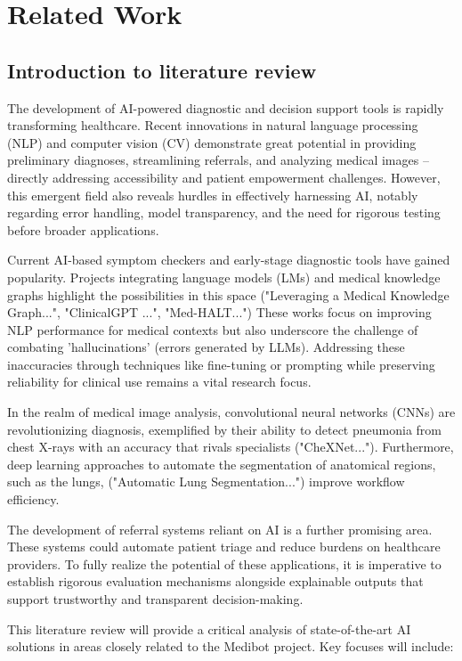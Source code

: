 \chapter{Related Work}

\section{Introduction to literature review}
The development of AI-powered diagnostic and decision support tools is rapidly transforming  healthcare. Recent innovations in natural language processing (NLP) and computer vision (CV) demonstrate great potential in providing preliminary diagnoses, streamlining referrals, and analyzing medical images – directly addressing accessibility and patient empowerment challenges. However, this emergent field also reveals hurdles in effectively harnessing AI, notably regarding  error handling, model transparency, and the need for rigorous testing before broader applications.

Current AI-based symptom checkers and early-stage diagnostic tools have gained popularity. Projects integrating language models (LMs) and medical knowledge graphs highlight the possibilities in this space ("Leveraging a Medical Knowledge Graph...", "ClinicalGPT ...", "Med-HALT...") These works focus on improving NLP performance for medical contexts but also underscore the challenge of combating 'hallucinations' (errors generated by LLMs). Addressing these inaccuracies through techniques like fine-tuning or prompting while preserving reliability for clinical use remains a vital research focus.

In the realm of medical image analysis, convolutional neural networks (CNNs) are revolutionizing diagnosis, exemplified by their ability to detect pneumonia from chest X-rays with an accuracy that rivals specialists ("CheXNet..."). Furthermore, deep learning approaches to automate the segmentation of anatomical regions, such as the lungs,  ("Automatic Lung Segmentation...") improve workflow efficiency.

The development of referral systems reliant on AI is a further promising area. These systems could automate patient triage and reduce burdens on healthcare providers. To fully realize the potential of these applications, it is imperative to establish rigorous evaluation mechanisms alongside explainable outputs that support trustworthy and transparent decision-making.

This literature review will provide a critical analysis of state-of-the-art AI solutions in areas closely related to the Medibot project. Key focuses will include:


